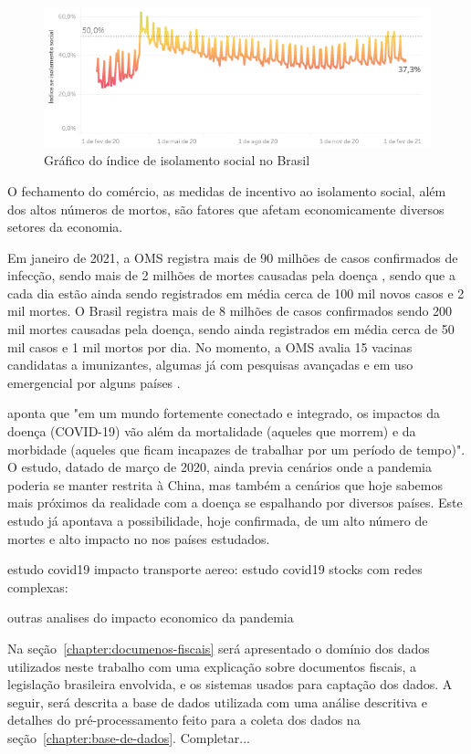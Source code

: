 \begin{figure}[htb]
    \centering
    \caption{Gráfico do índice de isolamento social no Brasil}
    \label{fig:intro-1.1-isolamento-social-brasil}
    \includegraphics[scale=0.7]{images/intro-1.1-isolamento-social-brasil.png}
\end{figure}

O fechamento do comércio, as medidas de incentivo ao isolamento social, além dos altos números de mortos, são fatores que afetam economicamente diversos setores da economia.

Em janeiro de 2021, a OMS registra mais de 90 milhões de casos confirmados de infecção, sendo mais de 2 milhões de mortes causadas pela doença \cite{oms:coronavirus-disease-dashboard}, sendo que a cada dia estão ainda sendo registrados em média cerca de 100 mil novos casos e 2 mil mortes. O Brasil registra mais de 8 milhões de casos confirmados sendo 200 mil mortes causadas pela doença, sendo ainda registrados em média cerca de 50 mil casos e 1 mil mortos por dia. No momento, a OMS avalia 15 vacinas candidatas a imunizantes, algumas já com pesquisas avançadas e em uso emergencial por alguns países \cite{oms:coronavirus-vaccines-status}.

 aponta que "em um mundo fortemente conectado e integrado, os impactos da doença (COVID-19) vão além da mortalidade (aqueles que morrem) e da morbidade (aqueles que ficam incapazes de trabalhar por um período de tempo)". O estudo, datado de março de 2020, ainda previa cenários onde a pandemia poderia se manter restrita à China, mas também a cenários que hoje sabemos mais próximos da realidade com a doença se espalhando por diversos países. Este estudo já apontava a possibilidade, hoje confirmada, de um alto número de mortes e alto impacto no  nos países estudados.




estudo covid19 impacto transporte aereo: \cite{sun2020did}
estudo covid19 stocks com redes complexas: \cite{aslam2020network}

outras analises do impacto economico da pandemia

Na seção~\ref{chapter:documenos-fiscais} será apresentado o domínio dos dados utilizados neste trabalho com uma explicação sobre documentos fiscais, a legislação brasileira envolvida, e os sistemas usados para captação dos dados. A seguir, será descrita a base de dados utilizada com uma análise descritiva e detalhes do pré-processamento feito para a coleta dos dados na seção~\ref{chapter:base-de-dados}. Completar...
